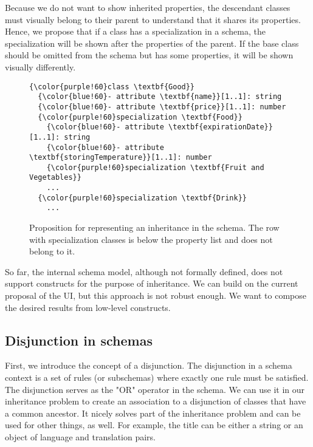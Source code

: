 \medskip

Because we do not want to show inherited properties, the descendant classes must visually belong to their parent to understand that it shares its properties. Hence, we propose that if a class has a specialization in a schema, the specialization will be shown after the properties of the parent. If the base class should be omitted from the schema but has some properties, it will be shown visually differently.

\begin{figure}[h!]\centering
  \begin{Verbatim}[commandchars=\\\{\}]
{\color{purple!60}class \textbf{Good}}
  {\color{blue!60}- attribute \textbf{name}}[1..1]: string
  {\color{blue!60}- attribute \textbf{price}}[1..1]: number
  {\color{purple!60}specialization \textbf{Food}}
    {\color{blue!60}- attribute \textbf{expirationDate}}[1..1]: string
    {\color{blue!60}- attribute \textbf{storingTemperature}}[1..1]: number
    {\color{purple!60}specialization \textbf{Fruit and Vegetables}}
    ...
  {\color{purple!60}specialization \textbf{Drink}}
    ...
\end{Verbatim}
  \caption{Proposition for representing an inheritance in the schema. The row with specialization classes is below the property list and does not belong to it.}
\end{figure}

So far, the internal schema model, although not formally defined, does not support constructs for the purpose of inheritance. We can build on the current proposal of the UI, but this approach is not robust enough. We want to compose the desired results from low-level constructs.

\subsection{Disjunction in schemas}

First, we introduce the concept of a disjunction. The disjunction in a schema context is a set of rules (or subschemas) where exactly one rule must be satisfied. The disjunction serves as the "OR" operator in the schema. We can use it in our inheritance problem to create an association to a disjunction of classes that have a common ancestor. It nicely solves part of the inheritance problem and can be used for other things, as well. For example, the title can be either a string or an object of language and translation pairs.

